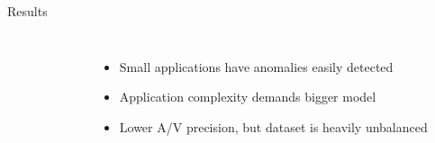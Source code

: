\begin{frame}{Results}
    \begin{columns}
        \vspace{-1cm}
        \begin{table}[!ht]
            \resizebox{\linewidth}{!}{
                
            }
        \end{table}
        \begin{figure}
            \centering
            
        \end{figure}

        \begin{itemize}
            \item Small applications have anomalies easily detected
            \item Application complexity demands bigger model
            \item Lower A/V precision, but dataset is heavily unbalanced
        \end{itemize}
    \end{columns}
\end{frame}

